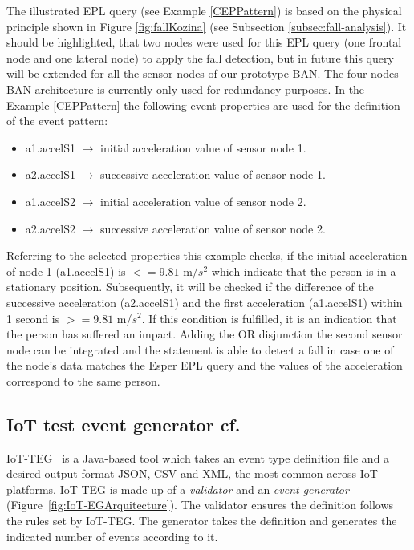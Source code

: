 \documentclass[10pt,journal,compsoc]{IEEEtran}
\begin{document}
The illustrated EPL query (see Example \ref{CEPPattern}) is based on the physical principle shown in Figure \ref{fig:fallKozina} (see Subsection \ref{subsec:fall-analysis}). It should be highlighted, that two nodes were used for this EPL query (one frontal node and one lateral node) to apply the fall detection, but in future this query will be extended for all the sensor nodes of our prototype BAN. The four nodes BAN architecture is currently only used for redundancy purposes. In the Example \ref{CEPPattern} the following event properties are used for the definition of the event pattern:
\begin{itemize}
	\item a1.accelS1 $\rightarrow$ initial acceleration value of sensor node 1.
	\item a2.accelS1 $\rightarrow$ successive acceleration value of sensor node 1.
	\item a1.accelS2 $\rightarrow$ initial acceleration value of sensor node 2.
	\item a2.accelS2 $\rightarrow$ successive acceleration value of sensor node 2.
\end{itemize}
Referring to the selected properties this example checks, if the initial acceleration of node 1 (a1.accelS1) is $<= 9.81$ m/$s^2$ which indicate that the person is in a stationary position. Subsequently, it will be checked if the difference of the successive acceleration (a2.accelS1) and the first acceleration (a1.accelS1) within 1 second is $>= 9.81$ m/$s^2$. If this condition is fulfilled, it is an indication that the person has suffered an impact. Adding the OR disjunction the second sensor node can be integrated and the statement is able to detect a fall in case one of the node's data matches the Esper EPL query and the values of the acceleration correspond to the same person.

\subsection{IoT test event generator cf.\cite{LorenaFall}}
\label{iotteg}

IoT-TEG~\cite{Gutierrez2017,TesisGutierrez2017} is a Java-based tool which takes an event 
type definition file and a desired output format JSON, CSV and XML, the most common across IoT platforms. IoT-TEG is made up of a \emph{validator} and an \emph{event generator} 
(Figure~\ref{fig:IoT-EGArquitecture}). The validator ensures the definition follows the rules set 
by IoT-TEG. The generator takes the definition and generates the indicated number of events according to it.
\end{document}
